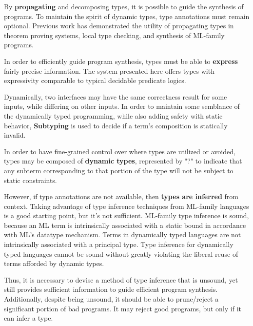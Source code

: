\documentclass[sigplan,screen]{acmart}
\begin{document}
By \textbf{propagating} and decomposing types, 
it is possible to guide the synthesis of programs.
To maintain the spirit of dynamic types, type annotations must remain optional.
Previous work has demonstrated the utility of propagating types 
in theorem proving systems, local type checking, 
and synthesis of ML-family programs.

In order to efficiently guide program synthesis, 
types must be able to \textbf{express} fairly precise information. 
The system presented here offers types with 
expressivity comparable to typical decidable predicate logics. 

Dynamically, two interfaces may have the same correctness result for some inputs,
while differing on other inputs.  
In order to maintain some semblance of the dynamically typed programming,
while also adding safety with static behavior,  
\textbf{Subtyping} is used to decide if a term's 
composition is statically invalid.   


In order to have fine-grained control over where types are utilized or avoided, 
types may be composed of \textbf{dynamic types}, represented by "?" to indicate 
that any subterm corresponding to that portion of the type 
will not be subject to static constraints.

However, if type annotations are not available, then \textbf{types are inferred} from context. 
Taking advantage of type inference techniques from ML-family languages is a good starting point,
but it's not sufficient. ML-family type inference is sound, because an ML term is 
intrinsically associated with a static bound in accordance with ML's datatype mechanism.
Terms in dynamically typed languages are not intrinsically associated with a principal type. 
Type inference for dynamically typed languages cannot be sound without greatly violating the 
liberal reuse of terms afforded by dynamic types. 

Thus, it is necessary to devise a method of type inference that is unsound, 
yet still provides sufficient information to guide efficient program synthesis.
Additionally, despite being unsound, it should be able to prune/reject 
a significant portion of bad programs. 
It may reject good programs, but only if it can infer a type.
\end{document}
